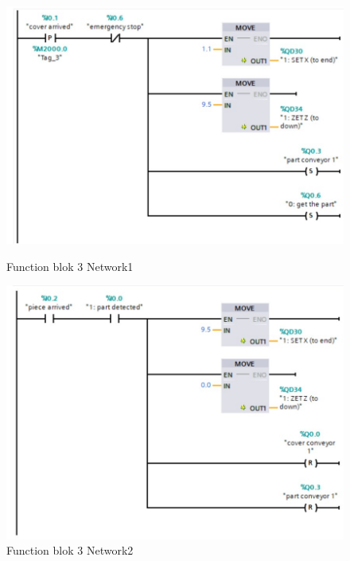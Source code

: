 \begin{figure}[h!]
    \centering
    \begin{minipage}{0.45\textwidth}  
        \centering
        \includegraphics[width=\textwidth]{imgs/io/tia5.1.jpg}  
        \caption[Function blok 3 Network1]{Function blok 3 Network1}
        \label{fig:first}
    \end{minipage} \hfill  
    \begin{minipage}{0.45\textwidth}  
        \centering
        \includegraphics[width=\textwidth]{imgs/io/tia5.2.jpg}  
        \caption[Function blok 3 Network2]{Function blok 3 Network2}
        \label{fig:second}
    \end{minipage}
\end{figure}

